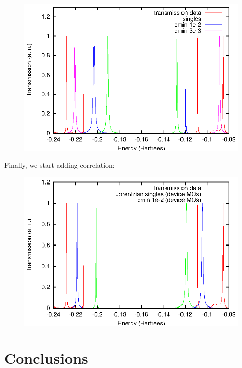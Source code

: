 \begin{figure}
	\begin{center}
		\includegraphics[width=0.9\linewidth]{figures/cipeaks}
	\end{center}
	\caption{}
	\label{fig:cipeaks}
\end{figure}

Finally, we start adding correlation:

\begin{figure}
	\begin{center}
		\includegraphics[width=0.9\linewidth]{figures/cipeaks-device}
	\end{center}
	\caption{}
	\label{fig:cipeaks-device}
\end{figure}

\section{Conclusions}
\label{sec:conclusions}

